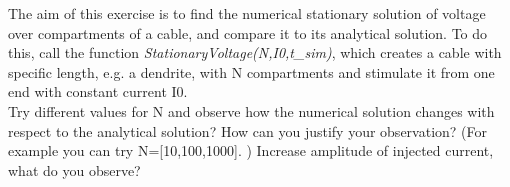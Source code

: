 \documentclass[a4paper,10pt]{Exercises}
\begin{document}
\Exercise[]

The aim of this exercise is to find the numerical stationary solution of voltage over compartments of a cable, and compare it to its analytical solution.
To do this, call the function \textit{StationaryVoltage(N,I0,t\_sim)}, which creates a  cable with specific length, e.g. a dendrite, with N compartments and stimulate it from one end with constant current I0.\\


\Question  Try different values for N and observe how the numerical solution changes with respect to the analytical solution? How can you justify your observation?
(For example you can try N=[10,100,1000]. )
\Question Increase amplitude of injected current, what do you observe?



\end{document}
